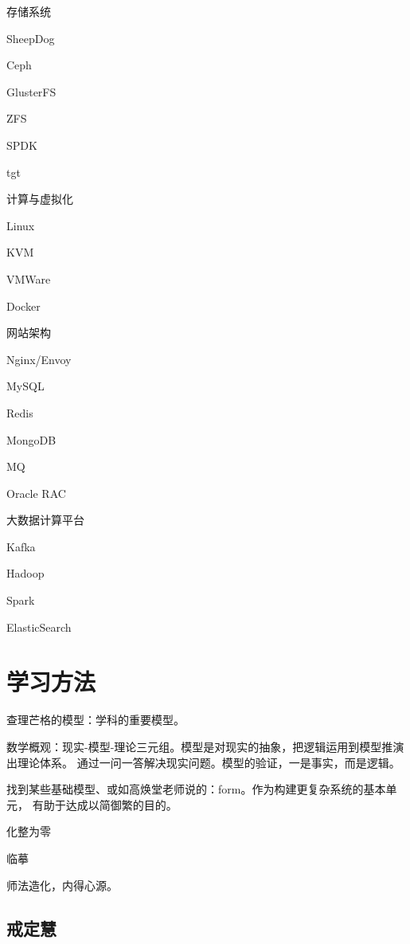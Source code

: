 存储系统
\begin{enumbox}
\item SheepDog
\item Ceph
\item GlusterFS
\item ZFS
\item SPDK
\item tgt
\end{enumbox}

计算与虚拟化
\begin{enumbox}
\item Linux
\item KVM
\item VMWare
\item Docker
\end{enumbox}

网站架构
\begin{enumbox}
\item Nginx/Envoy
\item MySQL
\item Redis
\item MongoDB
\item MQ
\item Oracle RAC
\end{enumbox}

大数据计算平台
\begin{enumbox}
\item Kafka
\item Hadoop
\item Spark
\item ElasticSearch
\end{enumbox}

\section{学习方法}

查理芒格的模型：学科的重要模型。

数学概观：现实-模型-理论三元组。模型是对现实的抽象，把逻辑运用到模型推演出理论体系。
通过一问一答解决现实问题。模型的验证，一是事实，而是逻辑。

找到某些基础模型、或如高焕堂老师说的：form。作为构建更复杂系统的基本单元，
有助于达成以简御繁的目的。

化整为零

临摹

师法造化，内得心源。

\subsection{戒定慧}

